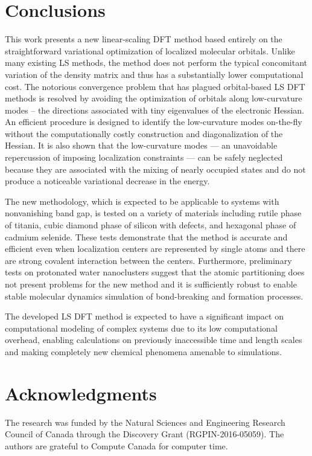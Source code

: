 \documentclass[aps,prl,twocolumn,reprint,amsmath,amssymb]{revtex4-1}
\begin{document}
\section{Conclusions} 

This work presents a new linear-scaling DFT method based entirely on the straightforward variational optimization of localized molecular orbitals. 
Unlike many existing LS methods, the method does not perform the typical concomitant variation of the density matrix and thus has a substantially lower computational cost. 
The notorious convergence problem that has plagued orbital-based LS DFT methods is resolved by avoiding the optimization of orbitals along low-curvature modes -- the directions associated with tiny eigenvalues of the electronic Hessian. 
An efficient procedure is designed to identify the low-curvature modes on-the-fly without the computationally costly construction and diagonalization of the Hessian. 
It is also shown that the low-curvature modes --- an unavoidable repercussion of imposing localization constraints --- can be safely neglected because they are associated with the mixing of nearly occupied states and do not produce a noticeable variational decrease in the energy. 

The new methodology, which is expected to be applicable to systems with nonvanishing band gap, is tested on a variety of materials including rutile phase of titania, cubic diamond phase of silicon with defects, and hexagonal phase of cadmium selenide. 
These tests demonstrate that the method is accurate and efficient even when localization centers are represented by single atoms and there are strong covalent interaction between the centers. 
Furthermore, preliminary tests on protonated water nanoclusters suggest that the atomic partitioning does not present problems for the new method and it is sufficiently robust to enable stable molecular dynamics simulation of bond-breaking and formation processes. 

The developed LS DFT method is expected to have a significant impact on computational modeling of complex systems due to its low computational overhead, enabling calculations on previously inaccessible time and length scales and making completely new chemical phenomena amenable to simulations.

\section{Acknowledgments} The research was funded by the Natural Sciences and Engineering Research Council of Canada through the Discovery Grant (RGPIN-2016-05059). The authors are grateful to Compute Canada for computer time.
\end{document}
